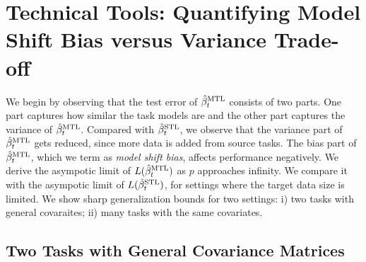 \section{Technical Tools: Quantifying Model Shift Bias versus Variance Trade-off}\label{sec_main}

We begin by observing that the test error of $\hat{\beta}_t^{\text{MTL}}$ consists of two parts.
One part captures how similar the task models are and the other part captures the variance of $\hat{\beta}_t^{\text{MTL}}$.
Compared with $\hat{\beta}_t^{\text{STL}}$, we observe that the variance part of $\hat{\beta}_t^{\text{MTL}}$ gets reduced, since more data is added from source tasks.
The bias part of $\hat{\beta}_t^{\text{MTL}}$, which we term as \textit{model shift bias}, affects performance negatively.
We derive the asympotic limit of $L(\hat{\beta}_t^{\text{MTL}})$ as $p$ approaches infinity.
We compare it with the asympotic limit of $L(\hat{\beta}_t^{\text{STL}})$, for settings where the target data size is limited.
We show sharp generalization bounds for two settings: i) two tasks with general covaraites; ii) many tasks with the same covariates.

\subsection{Two Tasks with General Covariance Matrices}

